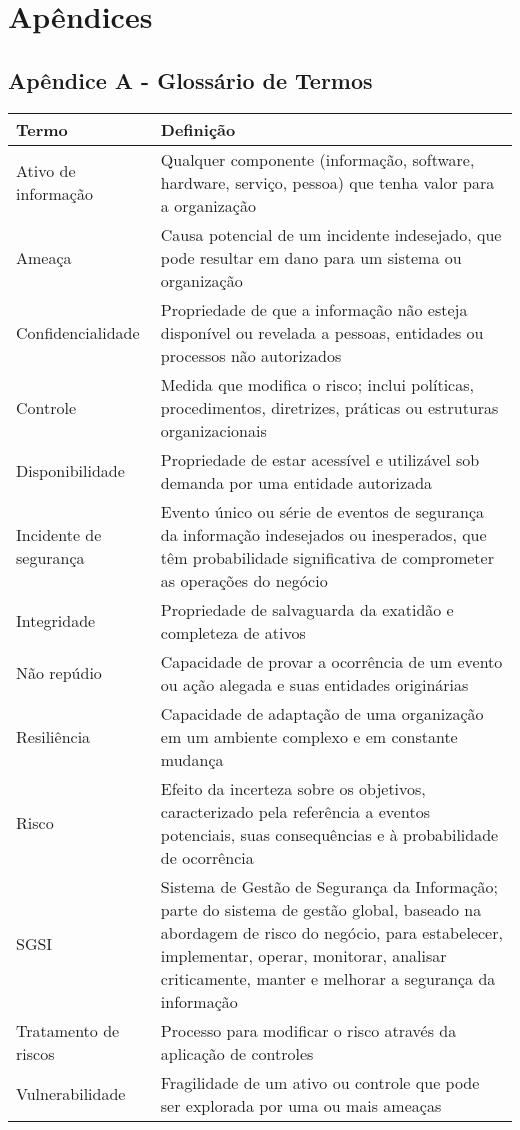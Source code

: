 \documentclass[12pt,a4paper]{report}
\begin{document}
\chapter{Apêndices}

\section{Apêndice A - Glossário de Termos}

\begin{longtable}{p{4cm}p{11cm}}
\toprule
\textbf{Termo} & \textbf{Definição} \\
\midrule
Ativo de informação & Qualquer componente (informação, software, hardware, serviço, pessoa) que tenha valor para a organização \\
\midrule
Ameaça & Causa potencial de um incidente indesejado, que pode resultar em dano para um sistema ou organização \\
\midrule
Confidencialidade & Propriedade de que a informação não esteja disponível ou revelada a pessoas, entidades ou processos não autorizados \\
\midrule
Controle & Medida que modifica o risco; inclui políticas, procedimentos, diretrizes, práticas ou estruturas organizacionais \\
\midrule
Disponibilidade & Propriedade de estar acessível e utilizável sob demanda por uma entidade autorizada \\
\midrule
Incidente de segurança & Evento único ou série de eventos de segurança da informação indesejados ou inesperados, que têm probabilidade significativa de comprometer as operações do negócio \\
\midrule
Integridade & Propriedade de salvaguarda da exatidão e completeza de ativos \\
\midrule
Não repúdio & Capacidade de provar a ocorrência de um evento ou ação alegada e suas entidades originárias \\
\midrule
Resiliência & Capacidade de adaptação de uma organização em um ambiente complexo e em constante mudança \\
\midrule
Risco & Efeito da incerteza sobre os objetivos, caracterizado pela referência a eventos potenciais, suas consequências e à probabilidade de ocorrência \\
\midrule
SGSI & Sistema de Gestão de Segurança da Informação; parte do sistema de gestão global, baseado na abordagem de risco do negócio, para estabelecer, implementar, operar, monitorar, analisar criticamente, manter e melhorar a segurança da informação \\
\midrule
Tratamento de riscos & Processo para modificar o risco através da aplicação de controles \\
\midrule
Vulnerabilidade & Fragilidade de um ativo ou controle que pode ser explorada por uma ou mais ameaças \\
\bottomrule
\end{longtable}
\end{document}
